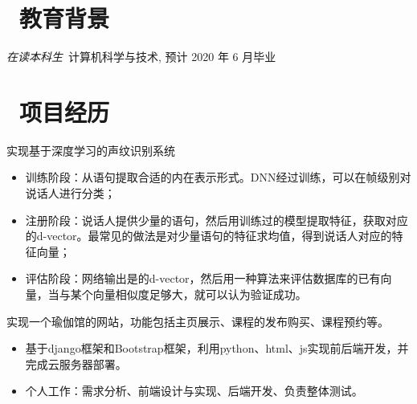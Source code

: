 \documentclass{resume}
\begin{document}


 
\section{\faGraduationCap\  教育背景}
\textit{在读本科生}\ 计算机科学与技术, 预计 2020 年 6 月毕业

\section{\faUsers\ 项目经历}

\begin{onehalfspacing}
实现基于深度学习的声纹识别系统
\begin{itemize}
  \item 训练阶段：从语句提取合适的内在表示形式。DNN经过训练，可以在帧级别对说话人进行分类；
  \item 注册阶段：说话人提供少量的语句，然后用训练过的模型提取特征，获取对应的d-vector。最常见的做法是对少量语句的特征求均值，得到说话人对应的特征向量；
  \item 评估阶段：网络输出是的d-vector，然后用一种算法来评估数据库的已有向量，当与某个向量相似度足够大，就可以认为验证成功。
\end{itemize}
\end{onehalfspacing}

\begin{onehalfspacing}
实现一个瑜伽馆的网站，功能包括主页展示、课程的发布购买、课程预约等。
\begin{itemize}
  \item 基于django框架和Bootstrap框架，利用python、html、js实现前后端开发，并完成云服务器部署。
  \item 个人工作：需求分析、前端设计与实现、后端开发、负责整体测试。
\end{itemize}
\end{onehalfspacing}

\end{document}
